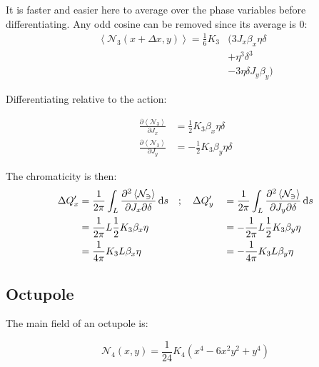 \documentclass[openright,twoside,headsepline,bibliography=totoc]{scrbook}
\begin{document}
It is faster and easier here to average over the phase variables before
differentiating. Any odd cosine can be removed since its average is 0:
\begin{equation}\begin{aligned}
  \left< \mathcal{N_3}(x + \Delta x, y) \right> = \frac{1}{6} K_3 &\biggl(
       3 J_x \beta_x \eta \delta \\
  &    + \eta^3 \delta^3 \\
  &    - 3 \eta \delta J_y \beta_y \biggl)
\end{aligned}\end{equation}

\vspace{.5cm}

Differentiating relative to the action:

\begin{equation}\begin{aligned}
\frac{\partial \left< \mathcal{N_3} \right>}{\partial J_x} &= \frac{1}{2} K_3 \beta_x \eta \delta \\
\frac{\partial \left< \mathcal{N_3} \right>}{\partial J_y} &= - \frac{1}{2} K_3 \beta_y \eta \delta
\end{aligned}\end{equation}

The chromaticity is then: \begin{equation}\begin{aligned}
\Delta Q'_x &= \frac{1}{2\pi} \int_L \frac{\partial^2 \left< \mathcal{N_3} \right>}{\partial J_x \partial \delta} \mathop{}\!\mathrm{d} s \quad; \quad \Delta Q'_y &&= \frac{1}{2\pi} \int_L \frac{\partial^2 \left< \mathcal{N_3} \right>}{\partial J_y \partial \delta} \mathop{}\!\mathrm{d} s \\
&= \frac{1}{2 \pi} L \frac{1}{2} K_3 \beta_x \eta  &&= - \frac{1}{2 \pi} L \frac{1}{2} K_3 \beta_y \eta \\
&= \frac{1}{4 \pi}  K_3 L \beta_x \eta &&= - \frac{1}{4 \pi}  K_3 L \beta_y \eta
\end{aligned}\end{equation}

\hypertarget{octupole-1}{%
\subsection{Octupole}\label{octupole-1}}

The main field of an octupole is:

\begin{equation}\mathcal{N}_4(x, y) = \frac{1}{24} K_4 (x^4 - 6x^2y^2 + y^4)\end{equation}
\end{document}
